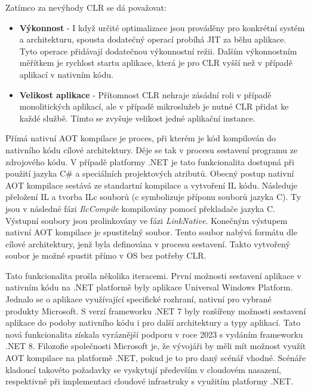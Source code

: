Zatímco za nevýhody CLR se dá považovat:

\begin{itemize}
    \item  \textbf{Výkonnost} - I když určité optimalizace jsou prováděny pro konkrétní systém a architekturu, spousta dodatečný operací probíhá JIT za běhu aplikace. Tyto operace přidávají dodatečnou výkonnostní režii. Dalším výkonnostním měřítkem je rychlost startu aplikace, která je pro CLR vyšší než v případě aplikací v nativním kódu.
    \item \textbf{Velikost aplikace} - Přítomnost CLR nehraje zásádní roli v případě monolitických aplikací, ale v případě mikroslužeb je nutné CLR přidat ke každé službě. Tímto se zvyšuje velikost jedné aplikační instance.
\end{itemize}


Přímá nativní AOT kompilace je proces, při kterém je kód kompilován do nativního kódu cílové architektury. Děje se tak v procesu sestavení programu ze zdrojového kódu. V případě platformy .NET je tato funkcionalita dostupná při použití jazyka C\# a speciálních projektových atributů. Obecný postup nativní AOT kompilace sestává ze standartní kompilace a vytvoření IL kódu. Následuje přeložení IL a tvorba ILc souborů (c symbolizuje příponu souborů jazyka C). Ty jsou v následné fázi \emph{IlcCompile} kompilovány pomocí překladače jazyka C. Výstupní soubory jsou prolinkovány ve fázi \emph{LinkNative}. Konečným výstupem nativní AOT kompilace je spustitelný soubor. Tento soubor nabývá formátu dle cílové architektury, jenž byla definována v procesu sestavení. Takto vytvořený soubor je možné spustit přímo v OS bez potřeby CLR.

Tato funkcionalita prošla několika iteracemi. První možnosti sestavení aplikace v nativním kódu na .NET platformě byly aplikace Universal Windows Platform. Jednalo se o aplikace využívající specifické rozhraní, nativní pro vybrané produkty Microsoft. S verzí frameworku .NET 7 byly rozšířeny možnosti sestavení aplikace do podoby nativního kódu i pro další architektury a typy aplikací. \cite{Pflug2023} Tato nová funkcionalita získala vyráznější podporu v roce 2023 s vydáním frameworku .NET 8. Filozofie společnosti Microsoft je, že vývojáři by měli mít možnost využít AOT kompilace na platformě .NET, pokud je to pro daný scénář vhodné. Scénáře kladoucí takovéto požadavky se vyskytují především v cloudovém nasazení, respektivně při implementaci cloudové infrastruky s využitím platformy .NET.

